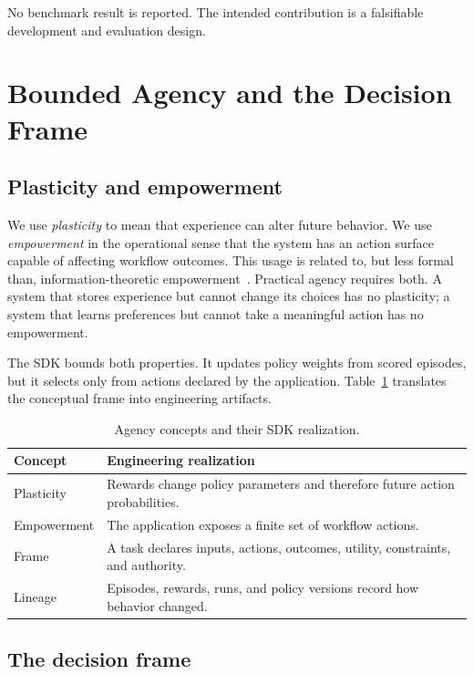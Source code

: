 \documentclass[conference]{IEEEtran}
\begin{document}
No benchmark result is reported. The intended contribution is a
falsifiable development and evaluation design.

\section{Bounded Agency and the Decision Frame}
\label{sec:frame}

\subsection{Plasticity and empowerment}

We use \emph{plasticity} to mean that experience can alter future
behavior. We use \emph{empowerment} in the operational sense that the
system has an action surface capable of affecting workflow outcomes.
This usage is related to, but less formal than, information-theoretic
empowerment~\cite{klyubin2005empowerment}. Practical agency requires
both. A system that stores experience but cannot change its choices
has no plasticity; a system that learns preferences but cannot take a
meaningful action has no empowerment.

The SDK bounds both properties. It updates policy weights from
scored episodes, but it selects only from actions declared by the
application. Table~\ref{tab:agency} translates the conceptual frame
into engineering artifacts.

\begin{table}[t]
\centering
\caption{Agency concepts and their SDK realization.}
\label{tab:agency}
\renewcommand{\arraystretch}{1.15}
\begin{tabular}{@{}p{1.65cm}p{5.75cm}@{}}
\toprule
\textbf{Concept} & \textbf{Engineering realization} \\
\midrule
Plasticity & Rewards change policy parameters and therefore future action probabilities. \\
Empowerment & The application exposes a finite set of workflow actions. \\
Frame & A task declares inputs, actions, outcomes, utility, constraints, and authority. \\
Lineage & Episodes, rewards, runs, and policy versions record how behavior changed. \\
\bottomrule
\end{tabular}
\end{table}

\subsection{The decision frame}
\end{document}
